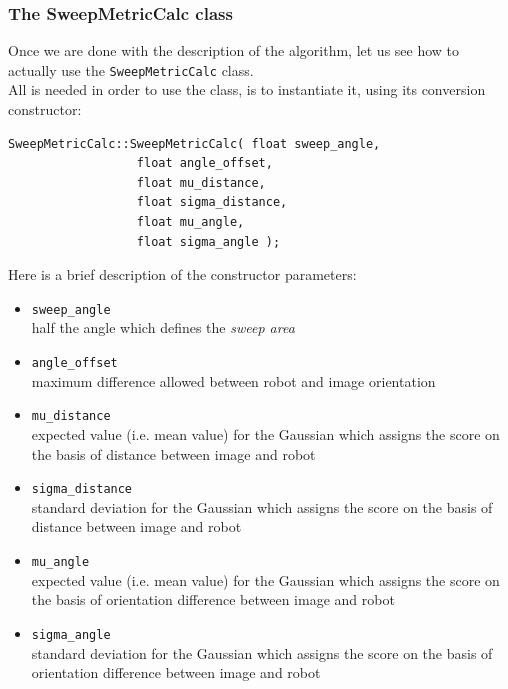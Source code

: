 \subsubsection{The SweepMetricCalc class}
\label{concr:iimageselector:sweep_metric_class}

Once we are done with the description of the algorithm, 
let us see how to actually use the \texttt{SweepMetricCalc} 
class. 
\\
All is needed in order to use the class, is to instantiate it,
using its conversion constructor:

\begin{lstlisting}[caption={\texttt{SweepMetricCalc} class declaration}, label={code:sweepmetriccalc}, frame=trBL]
SweepMetricCalc::SweepMetricCalc( float sweep_angle,
				  float angle_offset,
				  float mu_distance,
				  float sigma_distance,
				  float mu_angle,
				  float sigma_angle );				  
\end{lstlisting}

Here is a brief description of the constructor parameters:

\begin{itemize}
  \item \texttt{sweep\_angle} \\
    half the angle which defines the \textit{sweep area}
  \item \texttt{angle\_offset} \\
    maximum difference allowed between robot and 
    image orientation 
  \item \texttt{mu\_distance} \\
    expected value (i.e. mean value) for the Gaussian 
    which assigns the score on the basis of distance between
    image and robot
  \item \texttt{sigma\_distance} \\
    standard deviation for the Gaussian which assigns the 
    score on the basis of distance between image and robot
  \item \texttt{mu\_angle} \\
    expected value (i.e. mean value) for the Gaussian which 
    assigns the score on the basis of orientation difference
    between image and robot
  \item \texttt{sigma\_angle} \\
    standard deviation for the Gaussian which assigns the 
    score on the basis of orientation difference between image
    and robot
\end{itemize}


